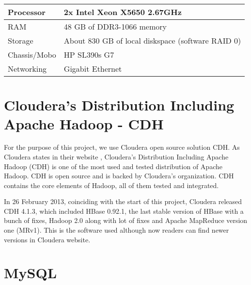 


\begin{table}[htbp]
\caption{}
\begin{center}
\begin{tabular}{|l|l|}
\hline
Processor  & 2x Intel Xeon X5650 2.67GHz \\ \hline
RAM  & 48 GB of DDR3-1066 memory \\ \hline
Storage  & About 830 GB of local diskspace (software RAID 0) \\ \hline
Chassis/Mobo  & HP SL390s G7 \\ \hline
Networking & Gigabit Ethernet \\ \hline
\end{tabular}
\end{center}
\label{Hardware description of the machines used for the experiments.}
\end{table}



\section{Cloudera's Distribution Including Apache Hadoop - CDH}
For the purpose of this project, we use Cloudera \cite{Cloudera} open source solution CDH. As Cloudera states in their website \cite{ClouderaCDH}, Cloudera's Distribution Including Apache Hadoop (CDH) is one of the most used and tested distribution of Apache Hadoop. CDH is open source and is backed by Cloudera's organization. CDH contains the core elements of Hadoop, all of them tested and integrated.
\par
In 26 February 2013, coinciding with the start of this project, Cloudera released CDH 4.1.3, which included HBase 0.92.1, the last stable version of HBase with a bunch of fixes, Hadoop 2.0 along with lot of fixes and Apache MapReduce version one (MRv1). This is the software used although now readers can find newer versions in Cloudera website.

\section{MySQL}

